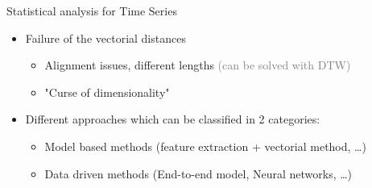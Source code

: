 \documentclass[ignorenonframetext]{beamer}
\def\keypoint#1{\hfill\textcolor{gray}{#1}}
\begin{document}

\begin{frame}{Statistical analysis for Time Series}
\Large

	\begin{itemize}\itemsep1em
		\item Failure of the vectorial distances\\[.5em]
		\begin{itemize}\itemsep1em\itemindent0em
		\item Alignment issues, different lengths \keypoint{(can be solved with DTW)}
		\item "Curse of dimensionality"
	\end{itemize}
		\item Different approaches which can be classified in 2 categories:\\[.5em]
	\begin{itemize}[<1>]\itemsep1em
		\item <-2>{Model based methods (feature extraction + vectorial method, \dots)} 
		\item Data driven methods (End-to-end model, Neural networks, \dots)
	\end{itemize}
	\end{itemize}

\end{frame}
\end{document}
